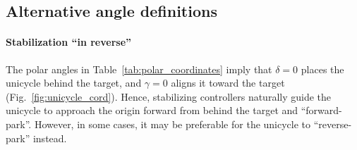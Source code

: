 \documentclass[journal,twoside,web]{ieeecolor}
\theoremstyle{definition}
\begin{document}
\subsection{Alternative angle definitions}

\paragraph{Stabilization ``in reverse''}
The polar angles in Table~\ref{tab:polar_coordinates} imply that $\delta=0$ places the unicycle behind the target, and $\gamma=0$ aligns it toward the target (Fig.~\ref{fig:unicycle_cord}). Hence, stabilizing controllers naturally guide the unicycle to approach the origin forward from behind the target and ``forward-park''. However, in some cases, it may be preferable for the unicycle to ``reverse-park'' instead.
\end{document}
